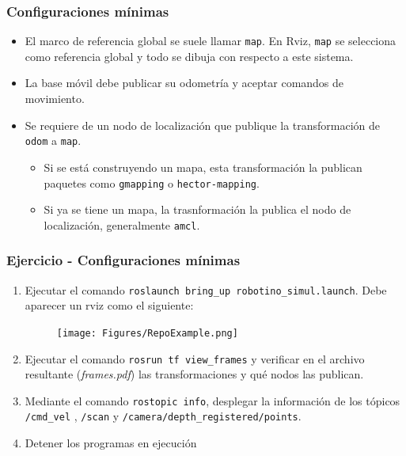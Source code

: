 \documentclass[10pt,spanish,aspectratio=1610]{beamer}
\begin{document}
\begin{frame}\frametitle{Configuraciones mínimas}
  \begin{itemize}
  \item El marco de referencia global se suele llamar \texttt{map}. En Rviz, \texttt{map} se selecciona como referencia global y todo se dibuja con respecto a este sistema.
  \item La base móvil debe publicar su odometría y aceptar comandos de movimiento.
  \item Se requiere de un nodo de localización que publique la transformación de \texttt{odom} a \texttt{map}.
    \begin{itemize}
    \item Si se está construyendo un mapa, esta transformación la publican paquetes como \texttt{gmapping} o \texttt{hector-mapping}.
    \item Si ya se tiene un mapa, la trasnformación la publica el nodo de localización, generalmente \texttt{amcl}. 
    \end{itemize}
  \end{itemize}
\end{frame}

\begin{frame}\frametitle{Ejercicio - Configuraciones mínimas}
  \begin{enumerate}
    \item Ejecutar el comando \texttt{roslaunch bring\_up robotino\_simul.launch}. Debe aparecer un rviz como el siguiente:
  \begin{figure}
    \centering
    \texttt{[image: Figures/RepoExample.png]}
  \end{figure}
  
  \item Ejecutar el comando \texttt{rosrun tf view\_frames} y verificar en el archivo resultante (\textit{frames.pdf}) las transformaciones y qué nodos las publican.
  \item Mediante el comando \texttt{rostopic info}, desplegar la información de los tópicos \texttt{/cmd\_vel} , \texttt{/scan} y \texttt{/camera/depth\_registered/points}.
    \item Detener los programas en ejecución
  \end{enumerate}
\end{frame}
\end{document}

